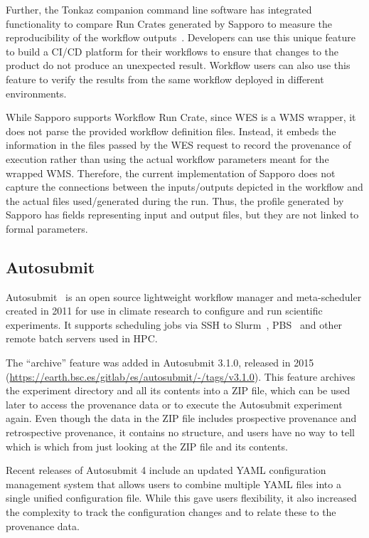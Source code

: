 \documentclass[10pt,letterpaper]{article}
\begin{document}
Further, the Tonkaz companion command line software has integrated functionality to compare Run Crates generated by Sapporo to measure the reproducibility of the workflow outputs~\cite{Suetake 2023}.
Developers can use this unique feature to build a CI/CD platform for their workflows to ensure that changes to the product do not produce an unexpected result.
Workflow users can also use this feature to verify the results from the same workflow deployed in different environments.

While Sapporo supports Workflow Run Crate, since WES is a WMS wrapper, it does not parse the provided workflow definition files. 
Instead, it embeds the information in the files passed by the WES request to record the provenance of execution rather than using the actual workflow parameters meant for the wrapped WMS.
Therefore, the current implementation of Sapporo does not capture the connections between the inputs/outputs depicted in the workflow and the actual files used/generated during the run.
Thus, the profile generated by Sapporo has fields representing input and output files, but they are not linked to formal parameters.

\subsection{Autosubmit}\label{autosubmit}

Autosubmit~\cite{Manubens-Gil 2016} is an open source lightweight workflow manager and meta-scheduler created in 2011 for use in climate research to configure and run scientific experiments.
It supports scheduling jobs via SSH to Slurm~\cite{Yoo 2003}, PBS~\cite{Feng 2007} and other remote batch servers used in HPC.

The ``archive'' feature was added in Autosubmit 3.1.0, released in 2015 (\url{https://earth.bsc.es/gitlab/es/autosubmit/-/tags/v3.1.0}).
This feature archives the experiment directory and all its contents into a ZIP file, which can be used later to access the provenance data or to execute the Autosubmit experiment again.
Even though the data in the ZIP file includes prospective provenance and retrospective provenance, it contains no structure, and users have no way to tell which is which from just looking at the ZIP file and its contents.

Recent releases of Autosubmit 4 include an updated YAML configuration management system that allows users to combine multiple YAML files into a single unified configuration file.
While this gave users flexibility, it also increased the complexity to track the configuration changes and to relate these to the provenance data.
\end{document}
